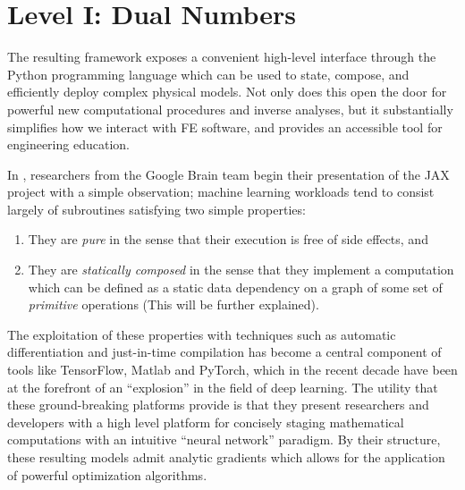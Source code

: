 \section{Level I: Dual Numbers}

The resulting framework exposes a convenient high-level interface
through the Python programming language which can be used to state,
compose, and efficiently deploy complex physical models. 
Not only does
this open the door for powerful new computational procedures and inverse
analyses, but it substantially simplifies how we interact with FE
software, and provides an accessible tool for engineering education.


In \textcite{frostig2018compiling}, researchers from the Google Brain
team begin their presentation of the JAX project with a
simple observation; machine learning workloads tend to consist largely
of subroutines satisfying two simple properties:

\begin{enumerate}
\def\labelenumi{\arabic{enumi}.}
\tightlist
\item
  They are \emph{pure} in the sense that their execution is free of side
  effects, and
\item
  They are \emph{statically composed} in the sense that they implement a
  computation which can be defined as a static data dependency on a
  graph of some set of \emph{primitive} operations (This will be further
  explained).
\end{enumerate}

The exploitation of these properties with techniques such as automatic
differentiation and just-in-time compilation has become a central
component of tools like TensorFlow, Matlab and PyTorch, which in the
recent decade have been at the forefront of an ``explosion'' in the
field of deep learning. The utility that these ground-breaking platforms
provide is that they present researchers and developers with a high
level platform for concisely staging mathematical computations with an
intuitive ``neural network'' paradigm. By their structure, these
resulting models admit analytic gradients which allows for the
application of powerful optimization algorithms.


